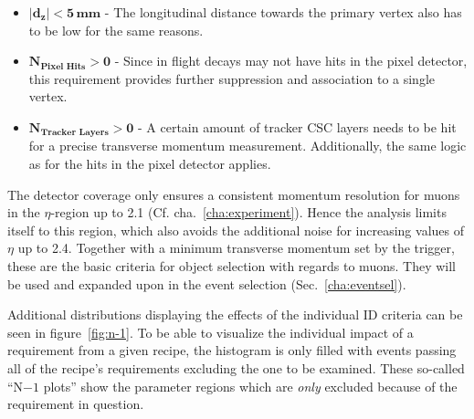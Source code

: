 \begin{itemize}
\item $\mathbf{|d_z| < 5\,\textbf{mm}}$ - The longitudinal distance towards the primary vertex also has to be low for the same reasons.
\item $\mathbf{N_{\textbf{Pixel Hits}} > 0}$ - Since in flight decays may not have hits in the pixel detector, this requirement provides further suppression and association to a single vertex.
\item $\mathbf{N_{\textbf{Tracker Layers}} > 0}$ - A certain amount of tracker CSC layers needs to be hit for a precise transverse momentum measurement. Additionally, the same logic as for the hits in the pixel detector applies.
\end{itemize}

The detector coverage only ensures a consistent momentum resolution for muons in the $\eta$-region up to 2.1 (Cf. cha.~\ref{cha:experiment}). Hence the analysis limits itself to this region, which also avoids the additional noise for increasing values of $\eta$ up to 2.4. Together with a minimum transverse momentum set by the trigger, these are the basic criteria for object selection with regards to muons. They will be used and expanded upon in the event selection (Sec.~\ref{cha:eventsel}).

Additional distributions displaying the effects of the individual ID criteria can be seen in figure~\ref{fig:n-1}. To be able to visualize the individual impact of a requirement from a given recipe, the histogram is only filled with events passing all of the recipe's requirements excluding the one to be examined. These so-called ``N$ - 1$ plots'' show the parameter regions which are \textit{only} excluded because of the requirement in question.

